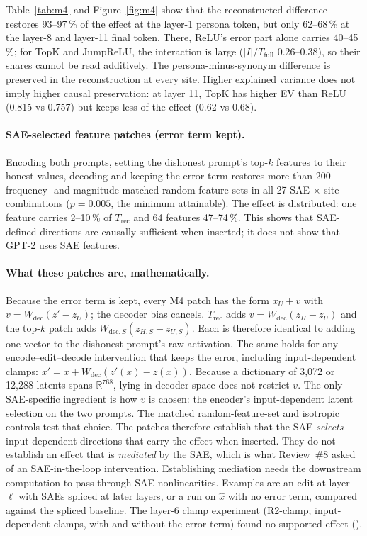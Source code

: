 Table~\ref{tab:m4} and Figure~\ref{fig:m4} show that the reconstructed difference restores 93--97\,\% of the effect at
the layer-1 persona token, but only 62--68\,\% at the layer-8 and layer-11 final token. There, ReLU's error part alone
carries 40--45\,\%; for TopK and JumpReLU, the interaction is large ($|I|/T_{\text{full}}$ 0.26--0.38), so their
shares cannot be read additively. The persona-minus-synonym difference is preserved in the reconstruction at every
site. Higher explained variance does not imply higher causal preservation: at layer 11, TopK has higher EV than ReLU
(0.815 vs 0.757) but keeps less of the effect (0.62 vs 0.68).

\paragraph{SAE-selected feature patches (error term kept).} Encoding both prompts, setting the dishonest prompt's top-$k$ features to
their honest values, decoding and keeping the error term restores more than 200 frequency- and magnitude-matched
random feature sets in all 27 SAE $\times$ site combinations ($p=0.005$, the minimum attainable). The effect is
distributed: one feature carries 2--10\,\% of $T_{\text{rec}}$ and 64 features 47--74\,\%. This shows that
SAE-defined directions are causally sufficient when inserted; it does not show that GPT-2 uses SAE features.

\paragraph{What these patches are, mathematically.} Because the error term is kept, every M4 patch has the form
$x_U+v$ with $v=W_{\text{dec}}(z'-z_U)$; the decoder bias cancels. $T_{\text{rec}}$ adds $v=W_{\text{dec}}(z_H-z_U)$
and the top-$k$ patch adds $W_{\text{dec},S}(z_{H,S}-z_{U,S})$. Each is therefore identical to adding one vector to
the dishonest prompt's raw activation. The same holds for any encode--edit--decode intervention that keeps the error,
including input-dependent clamps: $x'=x+W_{\text{dec}}(z'(x)-z(x))$. Because a dictionary of 3,072 or 12,288
latents spans $\mathbb{R}^{768}$, lying in decoder space does not restrict $v$. The only SAE-specific ingredient is how
$v$ is chosen: the encoder's input-dependent latent selection on the two prompts. The matched random-feature-set and
isotropic controls test that choice. The patches therefore establish that the SAE \emph{selects} input-dependent
directions that carry the effect when inserted. They do not establish an effect that is \emph{mediated} by the SAE,
which is what Review~\#8 asked of an SAE-in-the-loop intervention. Establishing mediation needs the downstream
computation to pass through SAE nonlinearities. Examples are an edit at layer $\ell$ with SAEs spliced at later
layers, or a run on $\hat{x}$ with no error term, compared against the spliced baseline. The layer-6 clamp
experiment (R2-clamp; input-dependent clamps, with and without the error term) found no supported effect
().

